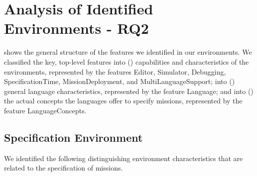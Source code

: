 \newcommand{\f}[1]{\textsf{#1}\xspace}

\newcommand{\flanguage}{\f{Language}}

\newcommand{\feditor}{\f{Editor}}
\newcommand{\fsimulator}{\f{Simulator}}
\newcommand{\fdebugging}{\f{Debugging}}
\newcommand{\fspectime}{\f{SpecificationTime}}
\newcommand{\fdeployment}{\f{MissionDeployment}}
\newcommand{\fmultilang}{\f{MultiLanguageSupport}}


\newcommand{\fsemantics}{\f{Semantics}}
\newcommand{\fnotation}{\f{Notation}}
\newcommand{\flangparadigm}{\f{LanguageParadigm}}
\newcommand{\fextensibility}{\f{Extensibility}}

\newcommand{\flangconcepts}{\f{LanguageConcepts}}


\newcommand{\fflowchart}{\f{FlowChart}}
\newcommand{\fblockly}{\f{Blockly}}


\section {Analysis of Identified Environments - RQ2}

 shows the general structure of the features we identified in our environments. 
We classified the key, top-level features into () capabilities and characteristics of the environments, represented by the features \feditor, \fsimulator, \fdebugging, \fspectime, \fdeployment, and \fmultilang; into () general language characteristics, represented by the feature \flanguage; and into () the actual concepts the languages offer to specify missions, represented by the feature \flangconcepts.


\subsection{Specification Environment}\label{sec:envfeatures}
\noindent
We identified the following distinguishing environment characteristics that are related to the specification of missions.

